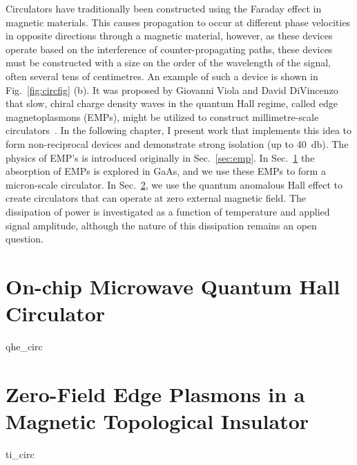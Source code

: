 Circulators have traditionally been constructed using the Faraday effect in magnetic materials. This causes propagation to occur at different phase
velocities in opposite directions through a magnetic material, however, as these devices operate based on the interference of counter-propagating paths,
these devices must be constructed with a size on the order of the wavelength of the signal, often several tens of centimetres. An example of such a device is
shown in Fig.~\ref{fig:circfig} (b). It was proposed by
Giovanni Viola and David DiVincenzo that slow, chiral charge density waves in the quantum Hall regime, called edge magnetoplasmons (EMPs), might be utilized to
construct millimetre-scale circulators~\cite{PhysRevX.4.021019}. In the following chapter, I present work that implements this idea to form non-reciprocal
devices and demonstrate strong isolation (up to \SI{40}{\decibel}). The physics of EMP's is introduced originally in Sec.~\ref{sec:emp}. In Sec.~\ref{sec:hallcirc} the
absorption of EMPs is explored in GaAs, and we use these EMPs to form a micron-scale circulator. In Sec.~\ref{sec:spinhallcirc}, we use the quantum anomalous Hall
effect to create circulators that can operate at zero external magnetic field. The dissipation of power is investigated as a function of temperature and applied signal
amplitude, although the nature of this dissipation remains an open question.

\clearpage
\section{On-chip Microwave Quantum Hall Circulator}
\label{sec:hallcirc}
{qhe_circ}

\clearpage
\section{Zero-Field Edge Plasmons in a Magnetic Topological Insulator}
\label{sec:spinhallcirc}
{ti_circ}
